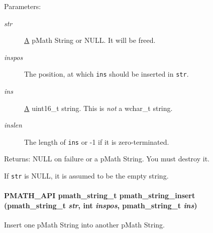 \begin{Desc}
\item[Parameters:]
\begin{description}
\item[{\em str}]\hyperlink{class_a}{A} pMath String or NULL. It will be freed. \item[{\em inspos}]The position, at which {\tt ins} should be inserted in {\tt str}. \item[{\em ins}]\hyperlink{class_a}{A} uint16\_\-t string. This is {\em not\/} a wchar\_\-t string. \item[{\em inslen}]The length of {\tt ins} or -1 if it is zero-terminated. \end{description}
\end{Desc}
\begin{Desc}
\item[Returns:]NULL on failure or a pMath String. You must destroy it.\end{Desc}
If {\tt str} is NULL, it is assumed to be the empty string. \hypertarget{group__strings_g563af717f21793d72933a9914b23a6aa}{
\paragraph[{pmath\_\-string\_\-insert}]{\setlength{\rightskip}{0pt plus 5cm}PMATH\_\-API {\bf pmath\_\-string\_\-t} pmath\_\-string\_\-insert ({\bf pmath\_\-string\_\-t} {\em str}, \/  int {\em inspos}, \/  {\bf pmath\_\-string\_\-t} {\em ins})}\hfill}
\label{group__strings_g563af717f21793d72933a9914b23a6aa}


Insert one pMath String into another pMath String. 

